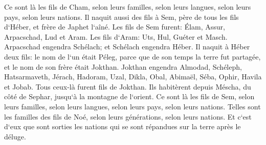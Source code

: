 \verse Ce sont là les fils de Cham, selon leurs familles, selon leurs langues, selon leurs pays, selon leurs nations. 
\verse Il naquit aussi des fils à Sem, père de tous les fils d`Héber, et frère de Japhet l`aîné. 
\verse Les fils de Sem furent: Élam, Assur, Arpacschad, Lud et Aram. 
\verse Les fils d`Aram: Uts, Hul, Guéter et Masch. 
\verse Arpacschad engendra Schélach; et Schélach engendra Héber. 
\verse Il naquit à Héber deux fils: le nom de l`un était Péleg, parce que de son temps la terre fut partagée, et le nom de son frère était Jokthan. 
\verse Jokthan engendra Almodad, Schéleph, Hatsarmaveth, Jérach, 
\verse Hadoram, Uzal, Dikla, 
\verse Obal, Abimaël, Séba, 
\verse Ophir, Havila et Jobab. Tous ceux-là furent fils de Jokthan. 
\verse Ils habitèrent depuis Méscha, du côté de Sephar, jusqu`à la montagne de l`orient. 
\verse Ce sont là les fils de Sem, selon leurs familles, selon leurs langues, selon leurs pays, selon leurs nations. 
\verse Telles sont les familles des fils de Noé, selon leurs générations, selon leurs nations. Et c`est d`eux que sont sorties les nations qui se sont répandues sur la terre après le déluge. 

